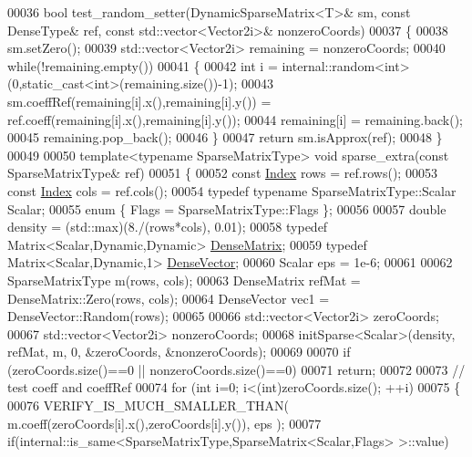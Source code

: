 \begin{DoxyCode}
00036 \textcolor{keywordtype}{bool} test\_random\_setter(DynamicSparseMatrix<T>& sm, \textcolor{keyword}{const} DenseType& ref, \textcolor{keyword}{const} std::vector<Vector2i>& 
      nonzeroCoords)
00037 \{
00038   sm.setZero();
00039   std::vector<Vector2i> remaining = nonzeroCoords;
00040   \textcolor{keywordflow}{while}(!remaining.empty())
00041   \{
00042     \textcolor{keywordtype}{int} i = internal::random<int>(0,\textcolor{keyword}{static\_cast<}\textcolor{keywordtype}{int}\textcolor{keyword}{>}(remaining.size())-1);
00043     sm.coeffRef(remaining[i].x(),remaining[i].y()) = ref.coeff(remaining[i].x(),remaining[i].y());
00044     remaining[i] = remaining.back();
00045     remaining.pop\_back();
00046   \}
00047   \textcolor{keywordflow}{return} sm.isApprox(ref);
00048 \}
00049 
00050 \textcolor{keyword}{template}<\textcolor{keyword}{typename} SparseMatrixType> \textcolor{keywordtype}{void} sparse\_extra(\textcolor{keyword}{const} SparseMatrixType& ref)
00051 \{
00052   \textcolor{keyword}{const} \hyperlink{namespace_eigen_a62e77e0933482dafde8fe197d9a2cfde}{Index} rows = ref.rows();
00053   \textcolor{keyword}{const} \hyperlink{namespace_eigen_a62e77e0933482dafde8fe197d9a2cfde}{Index} cols = ref.cols();
00054   \textcolor{keyword}{typedef} \textcolor{keyword}{typename} SparseMatrixType::Scalar Scalar;
00055   \textcolor{keyword}{enum} \{ Flags = SparseMatrixType::Flags \};
00056 
00057   \textcolor{keywordtype}{double} density = (std::max)(8./(rows*cols), 0.01);
00058   \textcolor{keyword}{typedef} Matrix<Scalar,Dynamic,Dynamic> \hyperlink{group___core___module}{DenseMatrix};
00059   \textcolor{keyword}{typedef} Matrix<Scalar,Dynamic,1> \hyperlink{group___core___module}{DenseVector};
00060   Scalar eps = 1e-6;
00061 
00062   SparseMatrixType m(rows, cols);
00063   DenseMatrix refMat = DenseMatrix::Zero(rows, cols);
00064   DenseVector vec1 = DenseVector::Random(rows);
00065 
00066   std::vector<Vector2i> zeroCoords;
00067   std::vector<Vector2i> nonzeroCoords;
00068   initSparse<Scalar>(density, refMat, m, 0, &zeroCoords, &nonzeroCoords);
00069 
00070   \textcolor{keywordflow}{if} (zeroCoords.size()==0 || nonzeroCoords.size()==0)
00071     \textcolor{keywordflow}{return};
00072 
00073   \textcolor{comment}{// test coeff and coeffRef}
00074   \textcolor{keywordflow}{for} (\textcolor{keywordtype}{int} i=0; i<(int)zeroCoords.size(); ++i)
00075   \{
00076     VERIFY\_IS\_MUCH\_SMALLER\_THAN( m.coeff(zeroCoords[i].x(),zeroCoords[i].y()), eps );
00077     \textcolor{keywordflow}{if}(internal::is\_same<SparseMatrixType,SparseMatrix<Scalar,Flags> >::value)

\end{DoxyCode}
